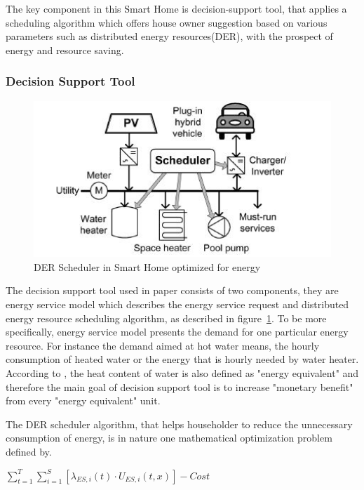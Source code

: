 The key component in this Smart Home is decision-support tool\cite{smart_home_for_energy}, that applies a scheduling algorithm which offers house owner suggestion based on various parameters such as distributed energy resources(DER), with the prospect of energy and resource saving.

\subsubsection{Decision Support Tool}

 \begin{figure}[!htbp]
	\centering
	\includegraphics[width=1.0\textwidth]{scheduler.jpg}
		\caption{DER Scheduler in Smart Home optimized for energy\cite{smart_home_for_energy}}
	\label{fig:smart-home-scheduler}
\end{figure}

The decision support tool used in paper\cite{smart_home_for_energy} consists of two components, they are energy service model which describes the energy service request and distributed energy resource scheduling algorithm, as described in figure~\ref{fig:smart-home-scheduler}. To be more specifically, energy service model presents the demand for one particular energy resource. For instance the demand aimed at hot water means, the hourly consumption of heated water or the energy that is hourly needed by water heater.  According to \cite{smart_home_for_energy}, the heat content of water is also defined as "energy equivalent" and therefore the main goal of decision support tool is to increase "monetary benefit"  from every "energy equivalent" unit.

The DER scheduler algorithm, that helps householder to reduce the unnecessary consumption of energy, is in nature one mathematical optimization problem defined by\cite{smart_home_for_energy}.
\begin{center}
 $ \sum_{t=1}^{T}\sum_{i=1}^{S}[\lambda_{ES,i}(t)\cdot {U_{ES,i}}(t,x)]-Cost$
\end{center}

